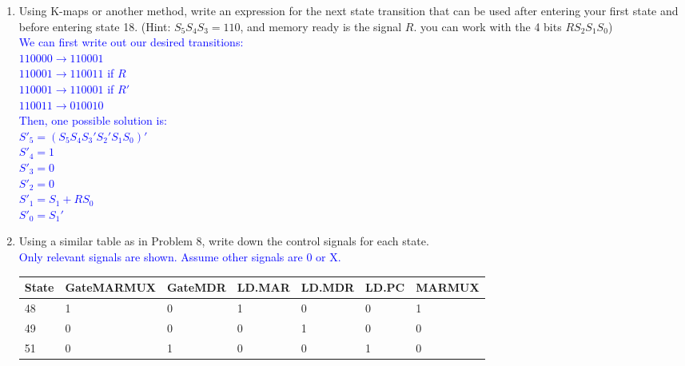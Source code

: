 \documentclass{article}
\begin{document}
\begin{enumerate}[label=(\alph*)]
\begin{enumerate}[label=(\alph*),itemsep = 20pt]
        \newpage
        \item Using K-maps or another method, write an expression for the next state transition that can be used after entering your first state and before entering state 18. (Hint: $S_5S_4S_3 = 110$, and memory ready is the signal $R$. you can work with the 4 bits $RS_2S_1S_0$) \\
        \textcolor{blue}{
        We can first write out our desired transitions: \\
        $110000 \longrightarrow 110001$ \\
        $110001 \longrightarrow 110011$ if $R$ \\
        $110001 \longrightarrow 110001$ if $R'$ \\
        $110011 \longrightarrow 010010$ \\
        Then, one possible solution is: \\
        $S'_5 = (S_5S_4S_3'S_2'S_1S_0)'$ \\
        $S'_4 = 1$ \\
        $S'_3 = 0$ \\
        $S'_2 = 0$ \\
        $S'_1 = S_1 + RS_0$ \\
        $S'_0 = S_1'$ \\ 
        }
        \item Using a similar table as in Problem 8, write down the control signals for each state. \\
        \textcolor{blue}{Only relevant signals are shown. Assume other signals are 0 or X.}
\begin{table}[!h]
\begin{tabular}{|l|l|l|l|l|l|l|}
\hline
\textbf{State} & \textbf{GateMARMUX} & \textbf{GateMDR} & \textbf{LD.MAR} & \textbf{LD.MDR} & \textbf{LD.PC} & \textbf{MARMUX} \\ \hline
48             & 1                   & 0                & 1               & 0               & 0              & 1               \\ \hline
49             & 0                   & 0                & 0               & 1               & 0              & 0               \\ \hline
51             & 0                   & 1                & 0               & 0               & 1              & 0               \\ \hline
\end{tabular}
\end{table}
\begin{table}[!h]

\end{table}
\end{enumerate}
\end{enumerate}
\end{document}
